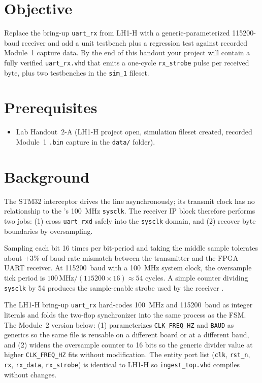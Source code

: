 \documentclass[11pt,letterpaper]{article}
\begin{document}

\section{Objective}
Replace the bring-up \texttt{uart\_rx} from LH1-H with a generic-parameterized 115200-baud \UART{} receiver and add a unit testbench plus a regression test against recorded Module~1 capture data. By the end of this handout your project will contain a fully verified \texttt{uart\_rx.vhd} that emits a one-cycle \texttt{rx\_strobe} pulse per received byte, plus two testbenches in the \texttt{sim\_1} fileset.

\section{Prerequisites}
\begin{itemize}[leftmargin=2em]
	\item Lab Handout~2-A (LH1-H project open, simulation fileset created, recorded Module~1 \texttt{.bin} capture in the \texttt{data/} folder).
\end{itemize}

\section{Background}
The STM32 interceptor drives the \UART{} line asynchronously; its transmit clock has no relationship to the \FPGA's 100~MHz \texttt{sysclk}. The \UART{} receiver IP block therefore performs two jobs: (1) cross \texttt{uart\_rxd} safely into the \texttt{sysclk} domain, and (2) recover byte boundaries by oversampling.

\begin{tcolorbox}[infobox={Why 16$\times$ oversampling?}]
	Sampling each bit 16 times per bit-period and taking the middle sample tolerates about $\pm$3\% of baud-rate mismatch between the transmitter and the FPGA UART receiver. At 115200~baud with a 100~MHz system clock, the oversample tick period is $100\,\mathrm{MHz} / (115200 \times 16) \approx 54$ cycles. A simple counter dividing \texttt{sysclk} by 54 produces the sample-enable strobe used by the receiver \FSM{}.
\end{tcolorbox}

\begin{tcolorbox}[infobox={What changes versus the LH1-H version?}]
	The LH1-H bring-up \texttt{uart\_rx} hard-codes 100~MHz and 115200~baud as integer literals and folds the two-flop synchronizer into the same process as the FSM. The Module~2 version below: (1) parameterizes \texttt{CLK\_FREQ\_HZ} and \texttt{BAUD} as generics so the same file is reusable on a different board or at a different baud, and (2) widens the oversample counter to 16 bits so the generic divider value at higher \texttt{CLK\_FREQ\_HZ} fits without modification. The entity port list (\texttt{clk}, \texttt{rst\_n}, \texttt{rx}, \texttt{rx\_data}, \texttt{rx\_strobe}) is identical to LH1-H so \texttt{ingest\_top.vhd} compiles without changes.
\end{tcolorbox}
\end{document}
